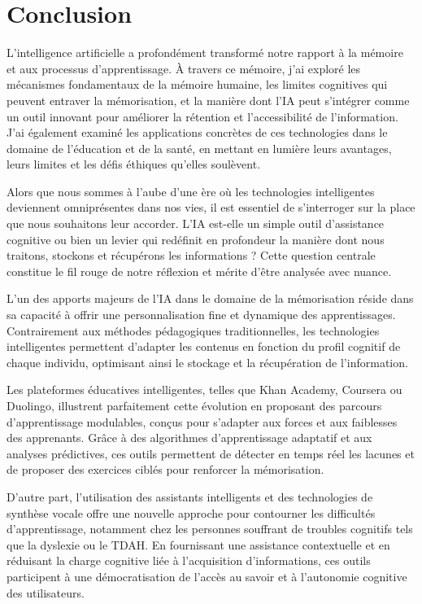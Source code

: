 \documentclass[11pt,a4paper]{report}
\begin{document}
\chapter*{Conclusion}

L’intelligence artificielle a profondément transformé notre rapport à la mémoire et aux processus d’apprentissage. À travers ce mémoire, j'ai exploré les mécanismes fondamentaux de la mémoire humaine, les limites cognitives qui peuvent entraver la mémorisation, et la manière dont l’IA peut s’intégrer comme un outil innovant pour améliorer la rétention et l’accessibilité de l’information. J'ai également examiné les applications concrètes de ces technologies dans le domaine de l’éducation et de la santé, en mettant en lumière leurs avantages, leurs limites et les défis éthiques qu’elles soulèvent.

Alors que nous sommes à l’aube d’une ère où les technologies intelligentes deviennent omniprésentes dans nos vies, il est essentiel de s’interroger sur la place que nous souhaitons leur accorder. L’IA est-elle un simple outil d’assistance cognitive ou bien un levier qui redéfinit en profondeur la manière dont nous traitons, stockons et récupérons les informations ? Cette question centrale constitue le fil rouge de notre réflexion et mérite d’être analysée avec nuance.

L’un des apports majeurs de l’IA dans le domaine de la mémorisation réside dans sa capacité à offrir une personnalisation fine et dynamique des apprentissages. Contrairement aux méthodes pédagogiques traditionnelles, les technologies intelligentes permettent d’adapter les contenus en fonction du profil cognitif de chaque individu, optimisant ainsi le stockage et la récupération de l’information.

Les plateformes éducatives intelligentes, telles que Khan Academy, Coursera ou Duolingo, illustrent parfaitement cette évolution en proposant des parcours d’apprentissage modulables, conçus pour s’adapter aux forces et aux faiblesses des apprenants. Grâce à des algorithmes d’apprentissage adaptatif et aux analyses prédictives, ces outils permettent de détecter en temps réel les lacunes et de proposer des exercices ciblés pour renforcer la mémorisation.

D’autre part, l’utilisation des assistants intelligents et des technologies de synthèse vocale offre une nouvelle approche pour contourner les difficultés d’apprentissage, notamment chez les personnes souffrant de troubles cognitifs tels que la dyslexie ou le TDAH. En fournissant une assistance contextuelle et en réduisant la charge cognitive liée à l’acquisition d’informations, ces outils participent à une démocratisation de l’accès au savoir et à l’autonomie cognitive des utilisateurs.
\end{document}
